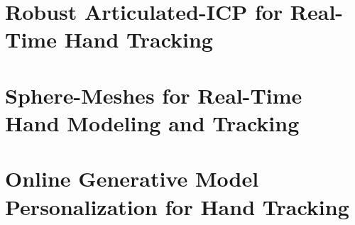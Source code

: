 

\usepackage{cite}
\usepackage{amsmath}
\usepackage{microtype}
\usepackage{overpic}
\usepackage{color}
\usepackage{amssymb}
\usepackage{graphicx}
\usepackage{changepage}
\usepackage{hyperref}
\usepackage{longtable}
\usepackage{lscape}

\hypersetup{
    colorlinks=true,
    filecolor=magenta,      
    urlcolor=cyan,
}

  








\frontmatter

%
%
%


\tableofcontents

\setlength{\parskip}{1em}

\mainmatter



\chapter{Robust Articulated-ICP for Real-Time Hand Tracking} \label{ch:tracking}












\chapter{Sphere-Meshes for Real-Time Hand Modeling and Tracking} \label{ch:sphere-meshes}




 







\chapter{Online Generative Model Personalization for Hand Tracking} \label{ch:online}

















